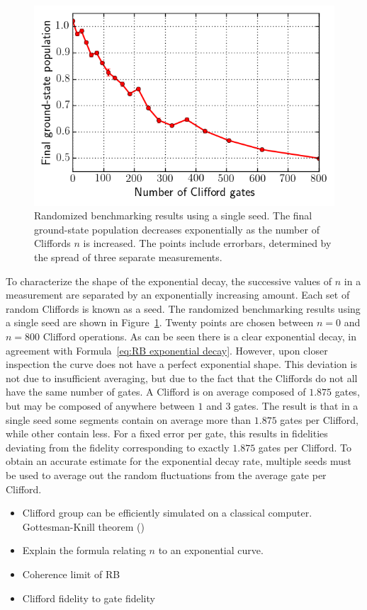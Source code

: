       \begin{figure}[tb]
        \centering
        \includegraphics[width=.6\textwidth]{../Figures/Randomized benchmarking/RB_single_seed.png}
        \caption{Randomized benchmarking results using a single seed. The final ground-state population decreases exponentially as the number of Cliffords $n$ is increased. The points include errorbars, determined by the spread of three separate measurements.}
        \label{fig:RB single seed}
      \end{figure}

      To characterize the shape of the exponential decay, the successive values of $n$ in a measurement are separated by an exponentially increasing amount. Each set of random Cliffords is known as a seed. The randomized benchmarking results using a single seed are shown in Figure~\ref{fig:RB single seed}. Twenty points are chosen between $n=0$ and $n=800$ Clifford operations. As can be seen there is a clear exponential decay, in agreement with Formula~\ref{eq:RB exponential decay}. However, upon closer inspection the curve does not have a perfect exponential shape. This deviation is not due to insufficient averaging, but due to the fact that the Cliffords do not all have the same number of gates. A Clifford is on average composed of $1.875$ gates, but may be composed of anywhere between $1$ and $3$ gates. The result is that in a single seed some segments contain on average more than $1.875$ gates per Clifford, while other contain less. For a fixed error per gate, this results in fidelities deviating from the fidelity corresponding to exactly $1.875$ gates per Clifford. To obtain an accurate estimate for the exponential decay rate, multiple seeds must be used to average out the random fluctuations from the average gate per Clifford.

      \begin{itemize}
        \item Clifford group can be efficiently simulated on a classical computer. Gottesman-Knill theorem (\cite{gottesman1998heisenberg})
        \item Explain the formula relating $n$ to an exponential curve.
        \item Coherence limit of RB
        \item Clifford fidelity to gate fidelity
      \end{itemize}

